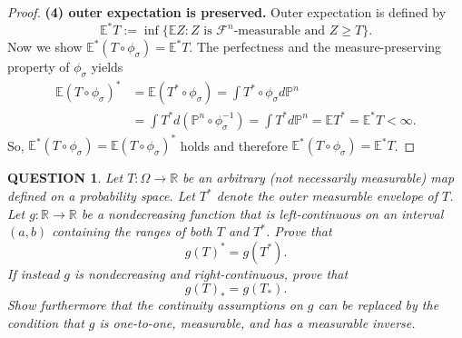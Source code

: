\documentclass[12pt]{article}
\renewcommand{\(}{\left(}%
\renewcommand{\)}{\right)}%
\renewcommand{\[}{\left[}%
\renewcommand{\]}{\right]}%
\newcommand{\p}{\mathbb{P}}
\newtheorem{question}{QUESTION}[section]}
\newtheorem{proof}{Proof.}}
\begin{document}
\begin{proof}
\medskip
\noindent \textbf{(4) outer expectation is preserved.}
Outer expectation is defined by
\begin{equation*}
\mathbb E^*T:=\inf\{\mathbb EZ: Z\text{ is } \mathscr F^{n}\text{-measurable and } Z\ge T\}.
\end{equation*}
Now we show $\mathbb E^*(T\circ\phi_\sigma)=\mathbb E^*T$. The perfectness and the measure-preserving property of $\phi_\sigma$ yields
\begin{equation*}
	\begin{split}
		\mathbb E(T\circ\phi_\sigma)^*&=\mathbb E (T^*\circ \phi_\sigma)=\int T^*\circ \phi_\sigma d\p^n\\
		&=\int T^* d(\p^n \circ \phi_\sigma^{-1})=\int T^*d\p^n=\mathbb E T^*=\mathbb E ^*T<\infty.
	\end{split}
\end{equation*}
So, $\mathbb E^*(T\circ\phi_\sigma)= \mathbb E(T\circ\phi_\sigma)^*$ holds and therefore $\mathbb E^*(T\circ\phi_\sigma)=\mathbb E^*T$.
\end{proof}

\begin{question}
Let $T:\Omega\to\mathbb R$ be an arbitrary (not necessarily measurable) map defined on a probability space. Let $T^*$ denote the outer measurable envelope of $T$.  Let $g:\mathbb R\to\mathbb R$ be a nondecreasing function that is left-continuous on an interval $(a,b)$ containing the ranges of both $T$ and $T^*$. Prove that
\begin{equation*}
g(T)^* = g(T^*).
\end{equation*}
If instead $g$ is nondecreasing and right-continuous, prove that
\begin{equation*}
g(T)_* = g(T_*).
\end{equation*}
Show furthermore that the continuity assumptions on $g$ can be replaced by the condition that $g$ is one-to-one, measurable, and has a measurable inverse.
\end{question}
\end{document}
